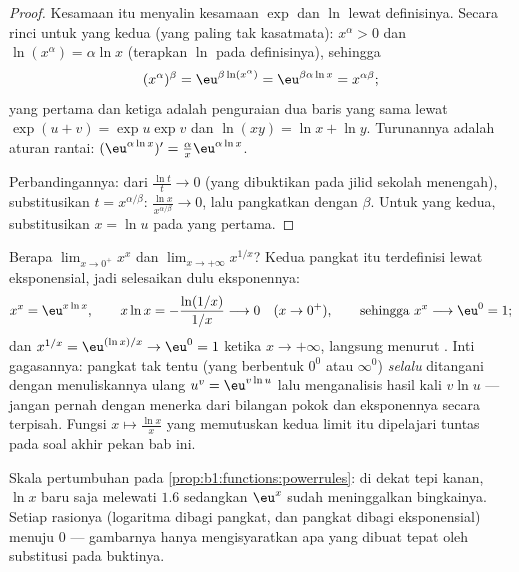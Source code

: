 \begin{proof}
Kesamaan itu menyalin kesamaan $\exp$ dan $\ln$ lewat
definisinya. Secara rinci untuk yang kedua (yang paling tak kasatmata): $x^\alpha
> 0$ dan $\ln(x^\alpha) = \alpha\ln x$ (terapkan $\ln$ pada
definisinya), sehingga
\[
(x^\alpha)^\beta = \eu^{\beta\ln(x^\alpha)}
= \eu^{\beta\alpha\ln x} = x^{\alpha\beta} ;
\]
yang pertama dan ketiga adalah penguraian dua baris yang sama lewat
$\exp(u + v) = \exp u\exp v$ dan $\ln(xy) = \ln x + \ln y$. Turunannya
adalah aturan rantai: $(\eu^{\alpha\ln x})' =
\frac{\alpha}{x} \eu^{\alpha\ln x}$.

Perbandingannya: dari $\frac{\ln t}{t} \to 0$ (yang dibuktikan pada jilid
sekolah menengah), substitusikan $t = x^{\alpha/\beta}$:
$\frac{\ln x}{x^{\alpha/\beta}} \to 0$, lalu pangkatkan dengan
$\beta$. Untuk yang kedua, substitusikan $x = \ln u$ pada yang pertama.
\end{proof}

\begin{example}\label{ex:b1:functions:xx}
Berapa $\lim_{x \to 0^+} x^x$ dan $\lim_{x \to +\infty}
x^{1/x}$? Kedua pangkat itu terdefinisi lewat eksponensial, jadi
selesaikan dulu eksponennya:
\[
x^x = \eu^{x\ln x}, \qquad
x\ln x = -\frac{\ln(1/x)}{1/x} \longrightarrow 0
\quad (x \to 0^+),
\qquad\text{sehingga } x^x \longrightarrow \eu^0 = 1 ;
\]
dan $x^{1/x} = \eu^{(\ln x)/x} \to \eu^0 = 1$ ketika $x \to +\infty$,
langsung menurut . Inti gagasannya: pangkat
tak tentu (yang berbentuk $0^0$ atau $\infty^0$) \emph{selalu} ditangani dengan
menuliskannya ulang $u^v = \eu^{v\ln u}$ lalu menganalisis hasil kali $v \ln u$
--- jangan pernah dengan menerka dari bilangan pokok dan eksponennya secara terpisah.
Fungsi $x \mapsto \frac{\ln x}{x}$ yang memutuskan kedua limit itu
dipelajari tuntas pada soal akhir pekan bab ini.
\end{example}

\begin{omfigure}

{\small Skala pertumbuhan pada
\cref{prop:b1:functions:powerrules}: di dekat tepi kanan, $\ln x$
baru saja melewati $1.6$ sedangkan $\eu^x$ sudah meninggalkan bingkainya. Setiap
rasionya (logaritma dibagi pangkat, dan pangkat dibagi eksponensial) menuju $0$ ---
gambarnya hanya mengisyaratkan apa yang dibuat tepat oleh substitusi pada
buktinya.}
\end{omfigure}


